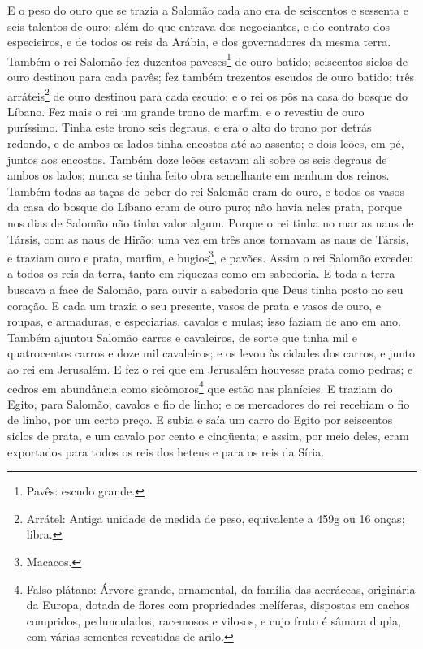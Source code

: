 E o peso do ouro que se trazia a Salomão cada ano era de
seiscentos e sessenta e seis talentos de ouro; além do que
entrava dos negociantes, e do contrato dos especieiros, e de todos
os reis da Arábia, e dos governadores da mesma terra. Também
o rei Salomão fez duzentos paveses\footnote{Pavês: escudo grande.}
de ouro batido; seiscentos siclos de ouro destinou para cada pavês;
fez também trezentos escudos de ouro batido; três
arráteis\footnote{Arrátel: Antiga unidade de medida de peso,
equivalente a 459g ou 16 onças; libra.} de ouro destinou para cada
escudo; e o rei os pôs na casa do bosque do Líbano. Fez mais
o rei um grande trono de marfim, e o revestiu de ouro puríssimo.
Tinha este trono seis degraus, e era o alto do trono por
detrás redondo, e de ambos os lados tinha encostos até ao assento; e
dois leões, em pé, juntos aos encostos. Também doze leões
estavam ali sobre os seis degraus de ambos os lados; nunca se tinha
feito obra semelhante em nenhum dos reinos. Também todas as
taças de beber do rei Salomão eram de ouro, e todos os vasos da casa
do bosque do Líbano eram de ouro puro; não havia neles prata, porque
nos dias de Salomão não tinha valor algum. Porque o rei tinha
no mar as naus de Társis, com as naus de Hirão; uma vez em três anos
tornavam as naus de Társis, e traziam ouro e prata, marfim, e
bugios\footnote{Macacos.}, e pavões. Assim o rei Salomão
excedeu a todos os reis da terra, tanto em riquezas como em
sabedoria. E toda a terra buscava a face de Salomão, para
ouvir a sabedoria que Deus tinha posto no seu coração. E cada
um trazia o seu presente, vasos de prata e vasos de ouro, e roupas,
e armaduras, e especiarias, cavalos e mulas; isso faziam de ano em
ano. Também ajuntou Salomão carros e cavaleiros, de sorte que
tinha mil e quatrocentos carros e doze mil cavaleiros; e os levou às
cidades dos carros, e junto ao rei em Jerusalém. E fez o rei
que em Jerusalém houvesse prata como pedras; e cedros em abundância
como sicômoros\footnote{Falso-plátano: Árvore grande, ornamental, da
família das aceráceas, originária da Europa, dotada de flores com
propriedades melíferas, dispostas em cachos compridos, pedunculados,
racemosos e vilosos, e cujo fruto é sâmara dupla, com várias
sementes revestidas de arilo.} que estão nas planícies. E
traziam do Egito, para Salomão, cavalos e fio de linho; e os
mercadores do rei recebiam o fio de linho, por um certo preço.
E subia e saía um carro do Egito por seiscentos siclos de
prata, e um cavalo por cento e cinqüenta; e assim, por meio deles,
eram exportados para todos os reis dos heteus e para os reis da
Síria.


